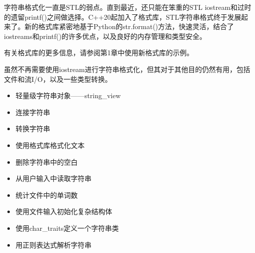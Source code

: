 字符串格式化一直是STL的弱点。直到最近，还只能在笨重的STL iostream和过时的遗留printf()之间做选择。C++20起加入了格式库，STL字符串格式终于发展起来了。新的格式库紧密地基于Python的str.format()方法，快速灵活，结合了iostreams和printf()的许多优点，以及良好的内存管理和类型安全。

有关格式库的更多信息，请参阅第1章中使用新格式库的示例。

虽然不再需要使用iostream进行字符串格式化，但其对于其他目的仍然有用，包括文件和流I/O，以及一些类型转换。

\begin{itemize}
\item 
轻量级字符串对象——string\_view

\item 
连接字符串

\item 
转换字符串

\item 
使用格式库格式化文本

\item 
删除字符串中的空白

\item 
从用户输入中读取字符串

\item 
统计文件中的单词数

\item 
使用文件输入初始化复杂结构体

\item 
使用char\_traits定义一个字符串类

\item 
用正则表达式解析字符串
\end{itemize}

















